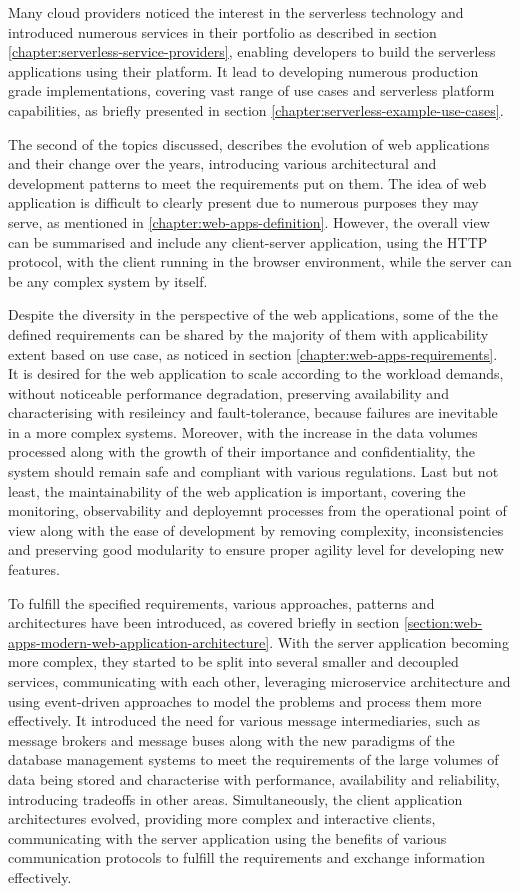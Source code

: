 Many cloud providers noticed the interest in the serverless technology and introduced numerous services in their portfolio as described in section \ref{chapter:serverless-service-providers}, enabling developers to build the serverless applications using their platform.
It lead to developing numerous production grade implementations, covering vast range of use cases and serverless platform capabilities, as briefly presented in section \ref{chapter:serverless-example-use-cases}.

The second of the topics discussed, describes the evolution of web applications and their change over the years, introducing various architectural and development patterns to meet the requirements put on them.
The idea of web application is difficult to clearly present due to numerous purposes they may serve, as mentioned in \ref{chapter:web-apps-definition}. However, the overall view can be summarised and include any client-server application, using the HTTP protocol, with the client running in the browser environment, while the server can be any complex system by itself.

Despite the diversity in the perspective of the web applications, some of the the defined requirements can be shared by the majority of them with applicability extent based on use case, as noticed in section \ref{chapter:web-apps-requirements}. 
It is desired for the web application to scale according to the workload demands, without noticeable performance degradation, preserving availability and characterising with resileincy and fault-tolerance, because failures are inevitable in a more complex systems. Moreover, with the increase in the data volumes processed along with the growth of their importance and confidentiality, the system should remain safe and compliant with various regulations. Last but not least, the maintainability of the web application is important, covering the monitoring, observability and deployemnt processes from the operational point of view along with the ease of development by removing complexity, inconsistencies and preserving good modularity to ensure proper agility level for developing new features.

To fulfill the specified requirements, various approaches, patterns and architectures have been introduced, as covered briefly in section \ref{section:web-apps-modern-web-application-architecture}.
With the server application becoming more complex, they started to be split into several smaller and decoupled services, communicating with each other, leveraging microservice architecture and using event-driven approaches to model the problems and process them more effectively.
It introduced the need for various message intermediaries, such as message brokers and message buses along with the new paradigms of the database management systems to meet the requirements of the large volumes of data being stored and characterise with performance, availability and reliability, introducing tradeoffs in other areas.
Simultaneously, the client application architectures evolved, providing more complex and interactive clients, communicating with the server application using the benefits of various communication protocols to fulfill the requirements and exchange information effectively.

